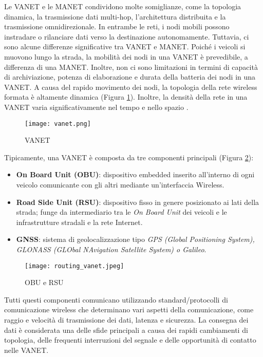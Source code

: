 Le VANET e le MANET condividono molte somiglianze, come la topologia dinamica, la trasmissione dati multi-hop, l'architettura distribuita e la trasmissione omnidirezionale. In entrambe le reti, i nodi mobili possono instradare o rilanciare dati verso la destinazione autonomamente. Tuttavia, ci sono alcune differenze significative tra VANET e MANET. Poiché i veicoli si muovono lungo la strada, la mobilità dei nodi in una VANET è prevedibile, a differenza di una MANET. Inoltre, non ci sono limitazioni in termini di capacità di archiviazione, potenza di elaborazione e durata della batteria dei nodi in una VANET. A causa del rapido movimento dei nodi, la topologia della rete wireless formata è altamente dinamica (Figura \ref{fig:vanet}). Inoltre, la densità della rete in una VANET varia significativamente nel tempo e nello spazio \cite{anwer2014survey} \cite{vehicular-ad-hoc}.

\begin{figure}[h!]
    \centering
    \texttt{[image: vanet.png]}
    \caption{VANET}
    \label{fig:vanet}
\end{figure}

Tipicamente, una VANET è composta da tre componenti principali (Figura \ref{fig:obu_rsu}): 
\begin{itemize}
    \item \textbf{On Board Unit (OBU)}: dispositivo embedded inserito all'interno di ogni veicolo comunicante con gli altri mediante un'interfaccia Wireless.
    \item \textbf{Road Side Unit (RSU)}: dispositivo fisso in genere posizionato ai lati della strada; funge da intermediario tra le \textit{On Board Unit} dei veicoli e le infrastrutture stradali e la rete Internet.
    \item \textbf{GNSS}: sistema di geolocalizzazione tipo \textit{GPS (Global Positioning System), GLONASS (GLObal NAvigation Satellite System) o Galileo}.
\end{itemize}

\begin{figure}[h!]
    \centering
    \texttt{[image: routing\_vanet.jpeg]}
    \caption{OBU e RSU}
    \label{fig:obu_rsu}
\end{figure}

Tutti questi componenti comunicano utilizzando standard/protocolli di comunicazione wireless che determinano vari aspetti della comunicazione, come raggio e velocità di trasmissione dei dati, latenza e sicurezza. La consegna dei dati è considerata una delle sfide principali a causa dei rapidi cambiamenti di topologia, delle frequenti interruzioni del segnale e delle opportunità di contatto nelle VANET. 

